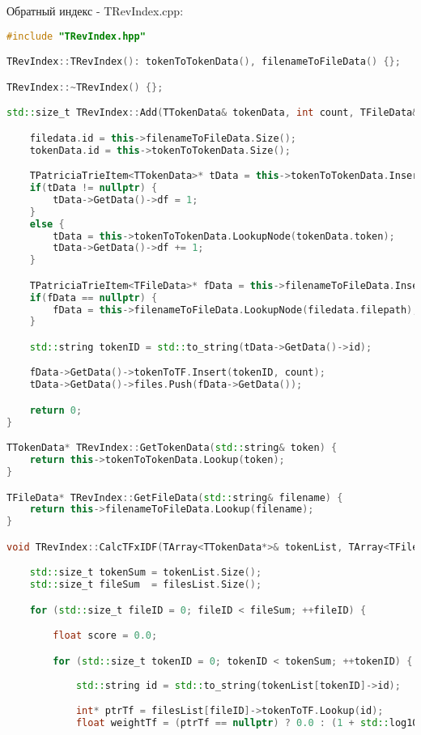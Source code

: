 Обратный индекс - TRevIndex.cpp:
\begin{lstlisting}[language=C++]
#include "TRevIndex.hpp"

TRevIndex::TRevIndex(): tokenToTokenData(), filenameToFileData() {};

TRevIndex::~TRevIndex() {};

std::size_t TRevIndex::Add(TTokenData& tokenData, int count, TFileData& filedata) {

    filedata.id = this->filenameToFileData.Size();
    tokenData.id = this->tokenToTokenData.Size();

    TPatriciaTrieItem<TTokenData>* tData = this->tokenToTokenData.Insert(tokenData.token, tokenData);
    if(tData != nullptr) {
        tData->GetData()->df = 1;
    }
    else {
        tData = this->tokenToTokenData.LookupNode(tokenData.token);
        tData->GetData()->df += 1;
    }

    TPatriciaTrieItem<TFileData>* fData = this->filenameToFileData.Insert(filedata.filepath, filedata);
    if(fData == nullptr) {
        fData = this->filenameToFileData.LookupNode(filedata.filepath);
    }

    std::string tokenID = std::to_string(tData->GetData()->id);

    fData->GetData()->tokenToTF.Insert(tokenID, count);
    tData->GetData()->files.Push(fData->GetData());

    return 0;
}

TTokenData* TRevIndex::GetTokenData(std::string& token) {
    return this->tokenToTokenData.Lookup(token);
}

TFileData* TRevIndex::GetFileData(std::string& filename) {
    return this->filenameToFileData.Lookup(filename);
}

void TRevIndex::CalcTFxIDF(TArray<TTokenData*>& tokenList, TArray<TFileData*>& filesList) {

    std::size_t tokenSum = tokenList.Size();
    std::size_t fileSum  = filesList.Size();

    for (std::size_t fileID = 0; fileID < fileSum; ++fileID) {

        float score = 0.0;

        for (std::size_t tokenID = 0; tokenID < tokenSum; ++tokenID) {
            
            std::string id = std::to_string(tokenList[tokenID]->id);

            int* ptrTf = filesList[fileID]->tokenToTF.Lookup(id);
            float weightTf = (ptrTf == nullptr) ? 0.0 : (1 + std::log10((float) *ptrTf));
            

\end{lstlisting}
